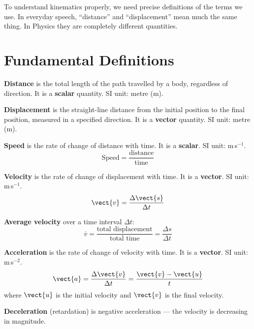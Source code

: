 To understand kinematics properly, we need precise
definitions of the terms we use. In everyday speech,
``distance'' and ``displacement'' mean much the same
thing. In Physics they are completely different quantities.

\section{Fundamental Definitions}

\begin{definitionbox}
\textbf{Distance} is the total length of the path
travelled by a body, regardless of direction.
It is a \textbf{scalar} quantity. SI unit: metre (m).

\vspace{0.4cm}

\textbf{Displacement} is the straight-line distance from
the initial position to the final position, measured in
a specified direction. It is a \textbf{vector} quantity.
SI unit: metre (m).
\end{definitionbox}

\vspace{2.3cm}

\begin{definitionbox}
\textbf{Speed} is the rate of change of distance with
time. It is a \textbf{scalar}. SI unit: m\,s$^{-1}$.
\[
  \text{Speed} = \frac{\text{distance}}{\text{time}}
\]

\textbf{Velocity} is the rate of change of displacement
with time. It is a \textbf{vector}. SI unit: m\,s$^{-1}$.
\[
  \vect{v} = \frac{\Delta\vect{s}}{\Delta t}
\]

\textbf{Average velocity} over a time interval $\Delta t$:
\[
  \bar{v} = \frac{\text{total displacement}}
  {\text{total time}} = \frac{\Delta s}{\Delta t}
\]
\end{definitionbox}

\begin{definitionbox}[Acceleration]
\textbf{Acceleration} is the rate of change of velocity
with time. It is a \textbf{vector}. SI unit: m\,s$^{-2}$.
\[
  \vect{a} = \frac{\Delta\vect{v}}{\Delta t}
  = \frac{\vect{v} - \vect{u}}{t}
\]
where $\vect{u}$ is the initial velocity and $\vect{v}$
is the final velocity.

\textbf{Deceleration} (retardation) is negative
acceleration --- the velocity is decreasing in magnitude.
\end{definitionbox}

